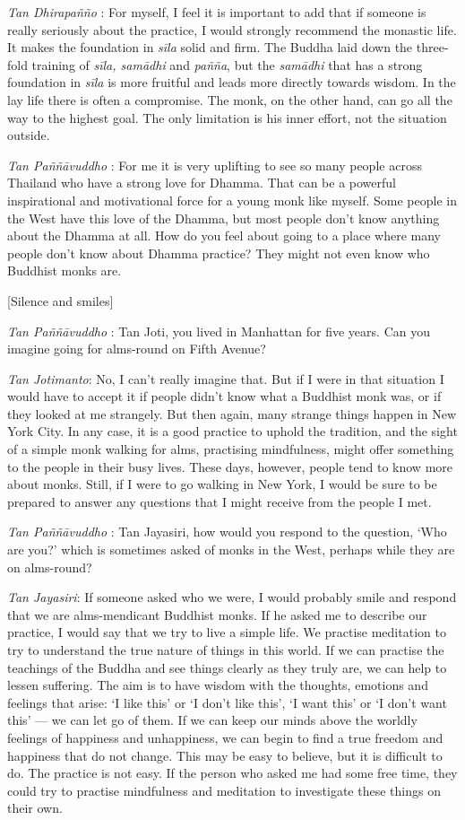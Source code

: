 \emph{Tan Dhirapañño} : For myself, I feel it is important to add that
if someone is really seriously about the practice, I would strongly
recommend the monastic life. It makes the foundation in \emph{sīla}
solid and firm. The Buddha laid down the three-fold training of
\emph{sīla, samādhi} and \emph{pañña}, but the \emph{samādhi} that has a
strong foundation in \emph{sīla} is more fruitful and leads more
directly towards wisdom. In the lay life there is often a compromise.
The monk, on the other hand, can go all the way to the highest goal. The
only limitation is his inner effort, not the situation outside.

\emph{Tan Paññāvuddho} : For me it is very uplifting to see so many
people across Thailand who have a strong love for Dhamma. That can be a
powerful inspirational and motivational force for a young monk like
myself. Some people in the West have this love of the Dhamma, but most
people don't know anything about the Dhamma at all. How do you feel
about going to a place where many people don't know about Dhamma
practice? They might not even know who Buddhist monks are.

{[}Silence and smiles{]}

\emph{Tan Paññāvuddho} : Tan Joti, you lived in Manhattan for five
years. Can you imagine going for alms-round on Fifth Avenue?

\emph{Tan Jotimanto}: No, I can't really imagine that. But if I were in
that situation I would have to accept it if people didn't know what a
Buddhist monk was, or if they looked at me strangely. But then again,
many strange things happen in New York City. In any case, it is a good
practice to uphold the tradition, and the sight of a simple monk walking
for alms, practising mindfulness, might offer something to the people in
their busy lives. These days, however, people tend to know more about
monks. Still, if I were to go walking in New York, I would be sure to be
prepared to answer any questions that I might receive from the people I
met.

\emph{Tan Paññāvuddho} : Tan Jayasiri, how would you respond to the
question, `Who are you?' which is sometimes asked of monks in the West,
perhaps while they are on alms-round?

\emph{Tan Jayasiri}: If someone asked who we were, I would probably
smile and respond that we are alms-mendicant Buddhist monks. If he asked
me to describe our practice, I would say that we try to live a simple
life. We practise meditation to try to understand the true nature of
things in this world. If we can practise the teachings of the Buddha and
see things clearly as they truly are, we can help to lessen suffering.
The aim is to have wisdom with the thoughts, emotions and feelings that
arise: `I like this' or `I don't like this', `I want this' or `I don't
want this' --- we can let go of them. If we can keep our minds above the
worldly feelings of happiness and unhappiness, we can begin to find a
true freedom and happiness that do not change. This may be easy to
believe, but it is difficult to do. The practice is not easy. If the
person who asked me had some free time, they could try to practise
mindfulness and meditation to investigate these things on their own.

